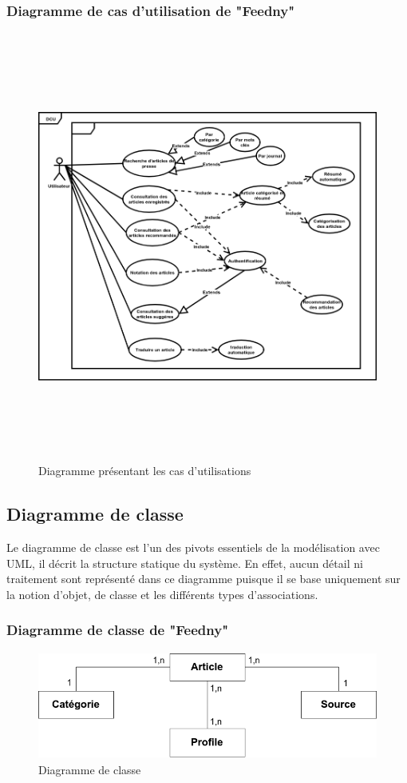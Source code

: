 \subsubsection{Diagramme de cas d'utilisation de "Feedny"}
\begin{figure}[H]
    \centering
    \includegraphics[height=400pt,width=350pt]{img/chapter3/diagcasdutilisation.png}
    \caption{Diagramme présentant les cas d'utilisations}
\end{figure}

\subsection{Diagramme de classe}
Le diagramme de classe est l'un des pivots essentiels de la modélisation avec UML, il décrit la structure statique du système. En effet, aucun détail ni traitement sont représenté dans ce diagramme puisque il 
se base uniquement sur la notion d'objet, de classe et les différents types d'associations.\cite{UML}

\subsubsection{Diagramme de classe de "Feedny"}
\begin{figure}[H]
    \centering
    \includegraphics[height=100pt,width=320pt]{img/chapter3/classdiagram.png}
    \caption{Diagramme de classe}
\end{figure}

